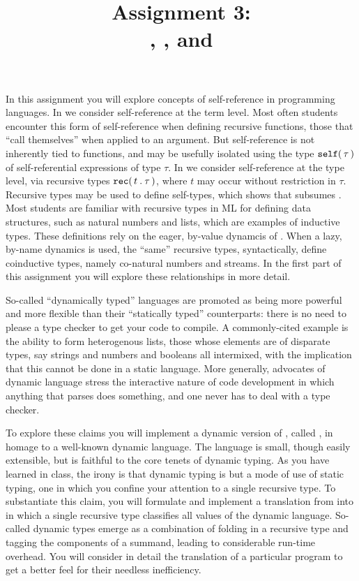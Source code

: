 \documentclass[11pt]{article}
\title{Assignment 3: \\
        \LangPCF{}, \LangFPC{}, and \LangPyCF{}}
\begin{document}
\maketitle

In this assignment you will explore concepts of self-reference in programming languages.  In \LangPCF{} we consider self-reference at the term level.  Most often students encounter this form of self-reference when defining recursive functions, those that ``call themselves'' when applied to an argument.  But self-reference is not inherently tied to functions, and may be usefully isolated using the type ${\mathtt{self}}\mathtt{(}\,\tau\,\mathtt{)}$ of self-referential expressions of type $\tau$.  In \LangFPC{} we consider self-reference at the type level, via recursive types ${\mathtt{rec}}\mathtt{(}\,{t}\mathbin{\mathtt{.}}{\tau}\,\mathtt{)}$, where $t$ may occur without restriction in $\tau$.  Recursive types may be used to define self-types, which shows that \LangFPC{} subsumes \LangPCF{}.  Most students are familiar with recursive types in ML for defining data structures, such as natural numbers and lists, which are examples of inductive types.  These definitions rely on the eager, by-value dynamcis of \LangFPC{}.  When a lazy, by-name dynamics is used, the ``same'' recursive types, syntactically, define coinductive types, namely co-natural numbers and streams.  In the first part of this assignment you will explore these relationships in more detail.

So-called ``dynamically typed'' languages are promoted as being more powerful and more flexible than their ``statically typed'' counterparts: there is no need to please a type checker to get your code to compile.  A commonly-cited example is the ability to form heterogenous lists, those whose elements are of disparate types, say strings and numbers and booleans all intermixed, with the implication that this cannot be done in a static language.  More generally, advocates of dynamic language stress the interactive nature of code development in which anything that parses does something, and one never has to deal with a type checker.

To explore these claims you will implement a dynamic version of \LangPCF, called \LangPyCF{}, in homage to a well-known dynamic language.  The language is small, though easily extensible, but is faithful to the core tenets of dynamic typing.  As you have learned in class, the irony is that dynamic typing is but a mode of use of static typing, one in which you confine your attention to a single recursive type.  To substantiate this claim, you will formulate and implement a translation from \LangPyCF{} into \LangFPC{} in which a single recursive type classifies all values of the dynamic language.  So-called dynamic types emerge as a combination of folding in a recursive type and tagging the components of a summand, leading to considerable run-time overhead.  You will consider in detail the translation of a particular \LangPyCF{} program to get a better feel for their needless inefficiency.
\end{document}
